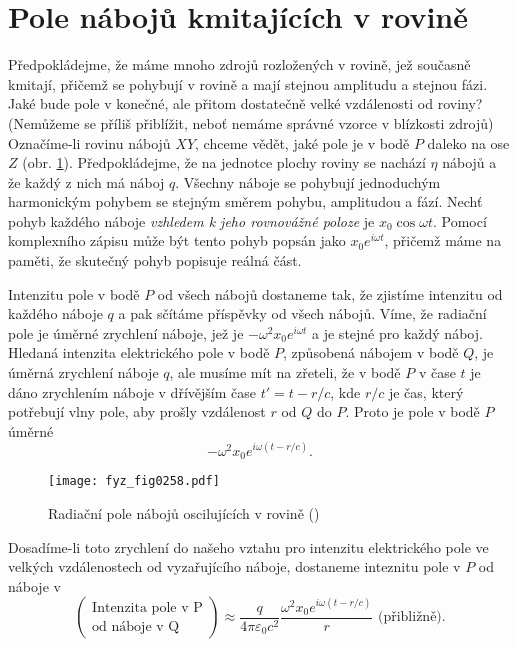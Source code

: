   \section{Pole nábojů kmitajících v rovině}\label{fyz:IchapXXXsecVII}
    Předpokládejme, že máme mnoho zdrojů rozložených v rovině, jež současně kmitají, přičemž se 
    pohybují v rovině a mají stejnou amplitudu a stejnou fázi. Jaké bude pole v konečné, ale přitom 
    dostatečně velké vzdálenosti od roviny? (Nemůžeme se příliš přiblížit, neboť nemáme správné 
    vzorce v blízkosti zdrojů) Označíme-li rovinu nábojů \(XY\), chceme vědět, jaké pole je v bodě 
    \(P\) daleko na ose \(Z\) (obr. \ref{fyz:fig0258}). Předpokládejme, že na jednotce plochy roviny 
    se nachází \(\eta\) nábojů a že každý z nich má náboj \(q\). Všechny náboje se pohybují 
    jednoduchým harmonickým pohybem se stejným směrem pohybu, amplitudou a fází. Nechť pohyb 
    každého náboje \emph{vzhledem k jeho rovnovážné poloze} je \(x_0\cos\omega t\). Pomocí 
    komplexního zápisu může být tento pohyb popsán jako \(x_0e^{i\omega t}\), přičemž máme na 
    paměti, že skutečný pohyb popisuje reálná část. 
    
    Intenzitu pole v bodě \(P\) od všech nábojů dostaneme tak, že zjistíme intenzitu od každého 
    náboje \(q\) a pak sčítáme příspěvky od všech nábojů. Víme, že radiační pole je úměrné 
    zrychlení náboje, jež je \(-\omega^2x_0e^{i\omega t}\) a je stejné pro každý náboj. Hledaná 
    intenzita elektrického pole v bodě \(P\), způsobená nábojem v bodě \(Q\), je úměrná zrychlení 
    náboje \(q\), ale musíme mít na zřeteli, že v bodě \(P\) v čase \(t\) je dáno zrychlením náboje 
    v dřívějším čase \(t' = t - r/c\), kde \(r/c\) je čas, který potřebují vlny pole, aby prošly 
    vzdálenost \(r\) od \(Q\) do \(P\). Proto je pole v bodě \(P\) úměrné
    \begin{equation}\label{fyz:eq327}
      - \omega^2x_0e^{i\omega(t-r/c)}.
    \end{equation}
    
    \begin{figure}[ht!] %
      \centering
      \texttt{[image: fyz\_fig0258.pdf]}
      \caption{Radiační pole nábojů oscilujících v rovině
               (\cite[s.~404]{Feynman01})}
      \label{fyz:fig0258}
    \end{figure}
    
    Dosadíme-li toto zrychlení do našeho vztahu pro intenzitu elektrického pole ve velkých  
    vzdálenostech od vyzařujícího náboje, dostaneme inteznitu pole v \(P\) od náboje v 
    \begin{equation*}
      \left(\begin{matrix}
         \text{Intenzita pole v P}  \\
         \text{od náboje v Q}
      \end{matrix}\right) \approx 
      \frac{q}{4\pi\varepsilon_0c^2}
      \frac{\omega^2x_0e^{i\omega(t-r/c)}}{r}\text{ (přibližně)}.
    \end{equation*}
    

